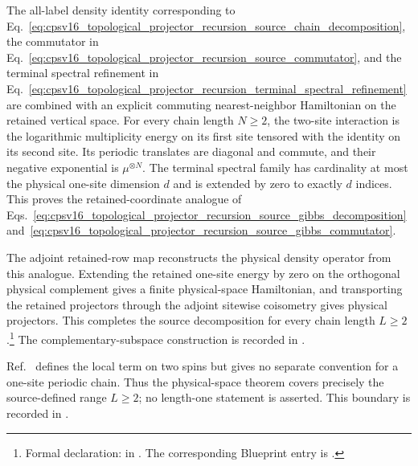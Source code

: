\documentclass{article}
\begin{document}
The all-label density identity corresponding to
Eq.~\ref{eq:cpsv16_topological_projector_recursion_source_chain_decomposition},
the commutator in
Eq.~\ref{eq:cpsv16_topological_projector_recursion_source_commutator}, and the
terminal spectral refinement in
Eq.~\ref{eq:cpsv16_topological_projector_recursion_terminal_spectral_refinement}
are combined with an explicit commuting nearest-neighbor Hamiltonian on the
retained vertical space. For every chain length $N\geq2$, the two-site
interaction is the logarithmic multiplicity energy on its first site tensored
with the identity on its second site. Its periodic translates are diagonal
and commute, and their negative exponential is $\mu^{\otimes N}$. The
terminal spectral family has cardinality at most the physical one-site
dimension $d$ and is extended by zero to exactly $d$ indices. This proves the
retained-coordinate analogue of
Eqs.~\ref{eq:cpsv16_topological_projector_recursion_source_gibbs_decomposition}
and~\ref{eq:cpsv16_topological_projector_recursion_source_gibbs_commutator}.

The adjoint retained-row map reconstructs the physical density operator from
this analogue. Extending the retained one-site energy by zero on the orthogonal
physical complement gives a finite physical-space Hamiltonian, and transporting
the retained projectors through the adjoint sitewise coisometry gives physical
projectors. This completes the source decomposition for every chain length
$L\geq2$.\footnote{Formal declaration:
in . The corresponding
Blueprint entry is
.}
The complementary-subspace construction is recorded in
.

Ref.~\cite{Cirac2016MPDO_arXiv} defines the local term on two spins but gives no
separate convention for a one-site periodic chain. Thus the physical-space
theorem covers precisely the source-defined range $L\geq2$; no length-one
statement is asserted. This boundary is recorded in
.



\end{document}
